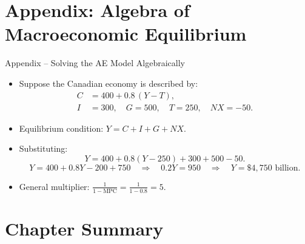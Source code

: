 \documentclass[aspectratio=169]{beamer}
\begin{document}
\section*{Appendix: Algebra of Macroeconomic Equilibrium}

\begin{frame}{Appendix -- Solving the AE Model Algebraically}
\transfade
\begin{itemize}
  \item Suppose the Canadian economy is described by:
  \begin{align*}
    C &= 400 + 0.8\,(Y - T),\\
    I &= 300,\quad G = 500,\quad T = 250,\quad NX = -50.
  \end{align*}
  \item Equilibrium condition: $Y = C + I + G + NX$.
  \item Substituting:
  \[
    Y = 400 + 0.8(Y - 250) + 300 + 500 - 50.
  \]
  \[
    Y = 400 + 0.8Y - 200 + 750
    \quad \Rightarrow \quad
    0.2Y = 950
    \quad \Rightarrow \quad
    \boxed{Y = \$4{,}750 \text{ billion}}.
  \]
  \item General multiplier: $\frac{1}{1 - \text{MPC}} = \frac{1}{1 - 0.8} = 5$.
\end{itemize}
\end{frame}

\section*{Chapter Summary}
\end{document}
